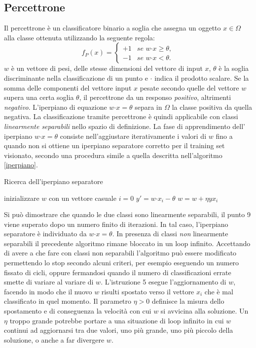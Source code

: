 \documentclass [11pt,a4paper,twoside,openright] {book}
\begin{document}
\subsection{Percettrone}
Il percettrone \cite{rosenblatt1958perceptron} è un classificatore binario a soglia che assegna un oggetto $x \in \Omega$ alla classe ottenuta utilizzando la seguente regola:
\[
f_P(x)=
\begin{cases}
+1 & \textit{se } w \boldsymbol{\cdot} x \geq \theta, \\
-1 & \textit{se } w \boldsymbol{\cdot} x < \theta.
\end{cases}
\]
$w$ è un vettore di pesi, delle stesse dimensioni del vettore di input $x$, $\theta$ è la soglia discriminante nella classificazione di un punto e $\boldsymbol{\cdot}$ indica il prodotto scalare. Se la somma delle componenti del vettore input $x$ pesate secondo quelle del vettore $w$ supera una certa soglia $\theta$, il percettrone da un responso \textit{positivo}, altrimenti \textit{negativo}. L'iperpiano di equazione $w \boldsymbol{\cdot} x = \theta$ separa in $\Omega$ la classe positiva da quella negativa. La classificazione tramite percettrone è quindi applicabile con classi \textit{linearmente separabili} nello spazio di definizione. La fase di apprendimento dell' iperpiano $w \boldsymbol{\cdot} x = \theta$ consiste nell'aggiustare iterativamente i valori di $w$ fino a quando non si ottiene un iperpiano separatore corretto per il training set visionato, secondo una procedura simile a quella descritta nell'algoritmo \ref{iperpiano}.
\begin{algorithm}
\caption{Ricerca dell'iperpiano separatore}\label{iperpiano}
\begin{algorithmic}[1]
\State inizializzare $w$ con un vettore casuale
	\State $i=0$
		\State $y' = w \boldsymbol{\cdot} x_i - \theta$
		 $w = w + \eta y x_i$ \EndIf
	\EndWhile
\EndWhile
\end{algorithmic}
\end{algorithm}
Si può dimostrare \cite{rosenblatt1958perceptron} che quando le due classi sono linearmente separabili, il punto 9 viene superato dopo un numero finito di iterazioni. In tal caso, l'iperpiano separatore è individuato da $w \boldsymbol{ \cdot} x = \theta$. In presenza di classi \textit{non} linearmente separabili il precedente algoritmo rimane bloccato in un loop infinito. Accettando di avere a che fare con classi non separabili l'algoritmo può essere modificato permettendo lo stop secondo alcuni criteri, per esempio eseguendo un numero fissato di cicli, oppure fermandosi quando il numero di classificazioni errate smette di variare al variare di $w$. L'istruzione 5 esegue l'aggiornamento di $w$, facendo in modo che il nuovo $w$ risulti spostato verso il vettore $x_i$ che è mal classificato in quel momento. Il parametro $\eta > 0$ definisce la misura dello spostamento e di conseguenza la velocità con cui $w$ si avvicina alla soluzione. Un $\eta$ troppo grande potrebbe portare a una situazione di loop infinito in cui $w$ continui ad aggiornarsi tra due valori, uno più grande, uno più piccolo della soluzione, o anche a far divergere $w$.\\
\end{document}
